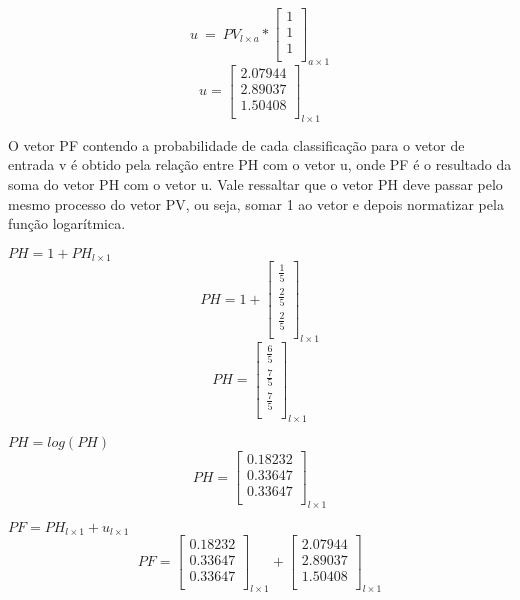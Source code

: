 \begin{anexosenv}
\begin{center}
$$u \ = \ PV _{l \times a} * \left[
\begin{array}{c}
1 \\
1 \\
1 \\
\end{array}
\right]_{a \times 1}$$
$$u=\left[
\begin{array}{c}
2.07944 \\
2.89037 \\
1.50408 \\
\end{array}
\right]_{l \times 1}$$
\end{center}

O vetor PF contendo a probabilidade de cada classificação para o vetor de
entrada v é obtido pela relação entre PH com o vetor u, onde PF é o resultado
da soma do vetor PH com o vetor u. Vale ressaltar que o vetor PH deve passar
pelo mesmo processo do vetor PV, ou seja, somar 1 ao vetor e depois normatizar
pela função logarítmica.

\begin{center}
$PH = 1 + PH_{l \times 1}$
$$PH=1 + \left[
\begin{array}{c}
\frac{1}{5} \\
\frac{2}{5} \\
\frac{2}{5} \\
\end{array}
\right]_{l \times 1}$$
$$PH=\left[
\begin{array}{c}
\frac{6}{5} \\
\frac{7}{5} \\
\frac{7}{5} \\
\end{array}
\right]_{l \times 1}$$
\end{center}

\begin{center}
$PH = log(PH)$
$$PH=\left[
\begin{array}{c}
0.18232 \\
0.33647 \\
0.33647 \\
\end{array}
\right]_{l \times 1}$$

$PF = PH_{l \times 1} + u_{l \times 1}$
$$PF=\left[
\begin{array}{c}
0.18232 \\
0.33647 \\
0.33647 \\
\end{array}
\right]_{l \times 1}
+
\left[
\begin{array}{c}
2.07944 \\
2.89037 \\
1.50408 \\
\end{array}
\right]_{l \times 1}
$$


\end{center}
\end{anexosenv}
